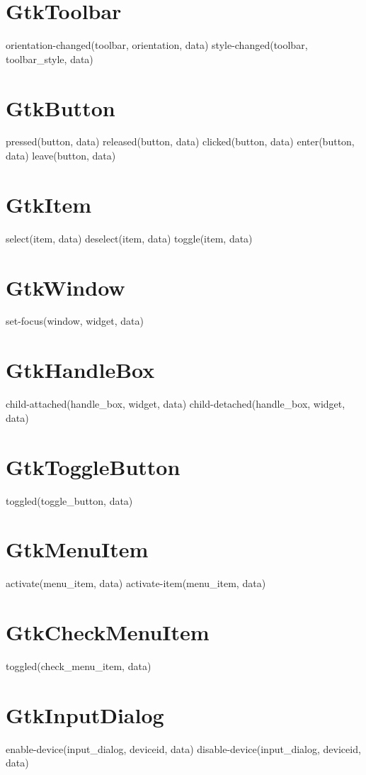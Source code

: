 	\section{GtkToolbar}
	orientation-changed(toolbar, orientation, data)
	style-changed(toolbar, toolbar_style, data)

	\section{GtkButton}
	pressed(button, data)
	released(button, data)
	clicked(button, data)
	enter(button, data)
	leave(button, data)

	\section{GtkItem}
	select(item, data)
	deselect(item, data)
	toggle(item, data)

	\section{GtkWindow}
	set-focus(window, widget, data)

	\section{GtkHandleBox}
	child-attached(handle_box, widget, data)
	child-detached(handle_box, widget, data)

	\section{GtkToggleButton}
	toggled(toggle_button, data)

	\section{GtkMenuItem}
	activate(menu_item, data)
	activate-item(menu_item, data)

	\section{GtkCheckMenuItem}
	toggled(check_menu_item, data)

	\section{GtkInputDialog}
	enable-device(input_dialog, deviceid, data)
	disable-device(input_dialog, deviceid, data)

